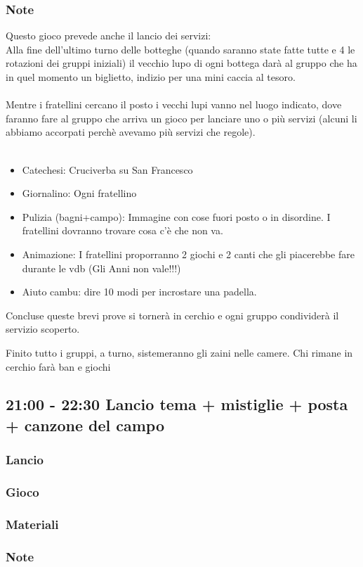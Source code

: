 \documentclass[../main.tex]{subfiles}
\begin{document}
        \subsubsection{Note}
        \label{sec:note}
        Questo gioco prevede anche il lancio dei servizi:\\
        Alla fine dell'ultimo turno delle botteghe (quando saranno state fatte tutte e 4 le rotazioni dei gruppi iniziali) il vecchio lupo di ogni bottega darà al gruppo che ha in quel momento un biglietto, indizio per una mini caccia al tesoro.\\
        \\
        Mentre i fratellini cercano il posto i vecchi lupi vanno nel luogo indicato, dove faranno fare al gruppo che arriva un gioco per lanciare uno o più servizi (alcuni li abbiamo accorpati perchè avevamo più servizi che regole).\\
        \\
        \begin{itemize}
            \item Catechesi: Cruciverba su San Francesco
            \item Giornalino: Ogni fratellino
            \item Pulizia (bagni+campo): Immagine con cose fuori posto o in disordine. I fratellini dovranno trovare cosa c'è che non va.
            \item Animazione: I fratellini proporranno 2 giochi e 2 canti che gli piacerebbe fare durante le vdb (Gli Anni non vale!!!)
            \item Aiuto cambu: dire 10 modi per incrostare una padella.
        \end{itemize}
        
        Concluse queste brevi prove si tornerà in cerchio e ogni gruppo condividerà il servizio scoperto.
        
        Finito tutto i gruppi, a turno, sistemeranno gli zaini nelle camere. Chi rimane in cerchio farà ban e giochi
    
    \subsection{21:00 - 22:30 Lancio tema + mistiglie + posta + canzone del campo}
    \subsubsection{Lancio}
    \subsubsection{Gioco}
    \subsubsection{Materiali}
    \subsubsection{Note}
\end{document}

